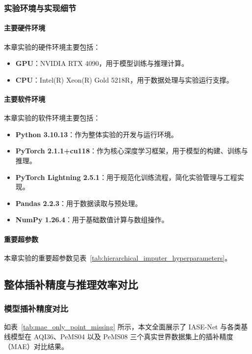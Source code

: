 \subsubsection{实验环境与实现细节}
\paragraph{主要硬件环境}
本章实验的硬件环境主要包括：
\begin{itemize}[noitemsep, topsep=0pt, partopsep=0pt, parsep=0pt, leftmargin=*]
    \item \textbf{GPU}：NVIDIA RTX 4090，用于模型训练与推理计算。
    \item \textbf{CPU}：Intel(R) Xeon(R) Gold 5218R，用于数据处理与实验运行支撑。
\end{itemize}

\paragraph{主要软件环境}
本章实验的软件环境主要包括：
\begin{itemize}[noitemsep, topsep=0pt, partopsep=0pt, parsep=0pt, leftmargin=*]
    \item \textbf{Python 3.10.13}：作为整体实验的开发与运行环境。
    \item \textbf{PyTorch 2.1.1+cu118}：作为核心深度学习框架，用于模型的构建、训练与推理。
    \item \textbf{PyTorch Lightning 2.5.1}：用于规范化训练流程，简化实验管理与工程实现。
    \item \textbf{Pandas 2.2.3}：用于数据读取与预处理。
    \item \textbf{NumPy 1.26.4}：用于基础数值计算与数组操作。
\end{itemize}

\paragraph{重要超参数}
本章实验的重要超参数见表~\ref{tab:hierarchical_imputer_hyperparameters}。




\subsection{整体插补精度与推理效率对比}

\subsubsection{模型插补精度对比}
如表~\ref{tab:mae_only_point_missing} 所示，本文全面展示了 IASE-Net 与各类基线模型在 \textsf{AQI36}、\textsf{PeMS04} 以及 \textsf{PeMS08} 三个真实世界数据集上的插补精度（MAE）对比结果。

